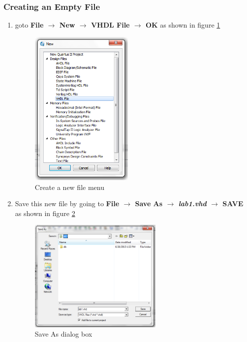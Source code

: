\subsubsection{Creating an Empty File}
\begin{enumerate}

\item goto {\bf File $\rightarrow$ New $\rightarrow$ VHDL File $\rightarrow$ OK } as shown in figure \ref{fig:newfile}

\begin{figure}[H]
	\centering
	\includegraphics[width=50mm]{Lab1/figures/newfile.png}
	\caption{Create a new file menu}
	\label{fig:newfile}
\end{figure}

\item Save this new file by going to {\bf File $\rightarrow$ Save As $\rightarrow$ \emph{lab1.vhd} $\rightarrow$ SAVE} as shown in figure \ref{fig:saveas}

\begin{figure}[H]
	\centering
	\includegraphics[width=65mm]{Lab1/figures/saveas.png}
	\caption{Save As dialog box}
	\label{fig:saveas}
\end{figure}

\end{enumerate}

